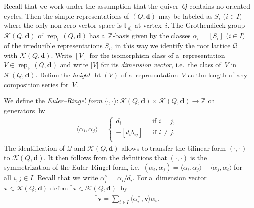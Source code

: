 \documentclass[pdftex]{sigma}
\numberwithin{equation}{section}
\begin{document}
Recall that we work under the assumption that the quiver~$Q$ contains no oriented cycles.
Then the simple representations of $(Q,\mathbf{d})$ may be labeled as $S_i$ ($i\in I$) where the only non-zero vector  %
space is $\mathbb{F}_{d_i}$ at vertex~$i$.
The Grothendieck group $\mathcal{K}(Q,\mathbf{d})$ of $\operatorname{rep}_\mathbb{F}(Q,\mathbf{d})$ has
a~$\mathbb{Z}$-basis given by the classes $\alpha_i=[S_i]$ ($i\in I$) of the irreducible representations $S_i$, in this
way we identify the root lattice $\mathcal{Q}$ with $\mathcal{K}(Q,\mathbf{d})$.
Write $[V]$ for the isomorphism class of a~representation $V\in\operatorname{rep}_\mathbb{F}(Q,\mathbf{d})$ and write
$|V|$ for its \emph{dimension vector}, i.e.~the class of~$V$ in $\mathcal{K}(Q,\mathbf{d})$.
Def\/ine the \emph{height} $\operatorname{ht}(V)$ of a~representation~$V$ as the length of any composition series for~$V$.

We def\/ine the \emph{Euler--Ringel form}
$\langle\cdot,\cdot\rangle:
\mathcal{K}(Q,\mathbf{d})\times\mathcal{K}(Q,\mathbf{d})\to\mathbb{Z}$ on generators~by
\begin{gather*}
\langle\alpha_i,\alpha_j\rangle=
\begin{cases}
d_i & \text{if $i=j$,}
\\
-[d_ib_{ij}]_+ & \text{if $i\ne j$.}
\end{cases}
\end{gather*}
The identif\/ication of $\mathcal{Q}$ and $\mathcal{K}(Q,\mathbf{d})$ allows to transfer the bilinear form $(\cdot,\cdot)$
to $\mathcal{K}(Q,\mathbf{d})$.
It then follows from the def\/initions that $(\cdot,\cdot)$ is the symmetrization of the Euler--Ringel form, %
i.e.~$(\alpha_i,\alpha_j)=\langle\alpha_i,\alpha_j\rangle+\langle\alpha_j,\alpha_i\rangle$ for all $i,j\in I$.
Recall that we write $\alpha_i^\vee=\alpha_i/d_i$.
For a~dimension vector $\mathbf{v}\in\mathcal{K}(Q,\mathbf{d})$ def\/ine ${}^*\mathbf{v}\in\mathcal{K}(Q,\mathbf{d})$~by
\begin{gather*}
{}^*\mathbf{v}=\sum\limits_{i\in I}\langle\alpha_i^\vee,\mathbf{v}\rangle\alpha_i.
\end{gather*}
\end{document}
